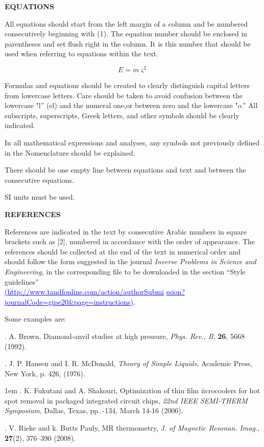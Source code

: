 \documentclass[conference,compsoc]{IEEEtran}
\begin{document}
\textbf{EQUATIONS}

All equations should start from the left margin of a column and be numbered consecutively beginning with (1). The equation number should be enclosed in parentheses and set flush right in the column. It is this number that should be used when referring to equations within the text.

\begin{equation}
\label{eq1}
E=m\varsigma^{2}
\end{equation}

Formulas and equations should be created to clearly distinguish capital letters from lowercase letters. Care should be taken to avoid confusion between the lowercase "l'' (el) and the numeral one,or between zero and the lowercase "o.'' All subscripts, superscripts, Greek letters, and other symbols should be clearly indicated.

In all mathematical expressions and analyses, any symbols not previously defined in the Nomenclature should be explained.

There should be one empty line between equations and text and between the consecutive equations.

SI units must be used.


\textbf{REFERENCES}

References are indicated in the text by consecutive Arabic numbers in square
brackets such as [2], numbered in accordance with the order of appearance.
The references should be collected at the end of the text in numerical order
and should follow the form suggested in the journal \textit{Inverse Problems in Science and Engineering,} in the corresponding
file to be downloaded in the section ``Style guidelines''\\
\textcolor{blue}{\underline{(http://www.tandfonline.com/action/authorSubmi}}
\textcolor{blue}{\underline{ssion?journalCode=gipe20\&page=instructions)}}.

Some examples are:

. A. Brown, Diamond-anvil studies at high pressure, \textit{Phys. Rev., B}, \textbf{26}, 5668
(1992).

. J. P. Hansen and I. R. McDonald, \textit{Theory of Simple Liquids}, Academic Press, New York, p. 426,
(1976).

\hangindent 1em
. K. Fukutani and A. Shakouri, Optimization of thin film iicrocoolers for
hot spot removal in packaged integrated circuit chips, \textit{22nd IEEE SEMI-THERM Symposium}, Dallas, Texas, pp.
-134, March 14-16 (2006).

. V. Rieke and k. Butts Pauly, MR thermometry, \textit{J. of Magnetic Resonan. Imag.}, \textbf{27}(2), 376--390
(2008).
\end{document}
